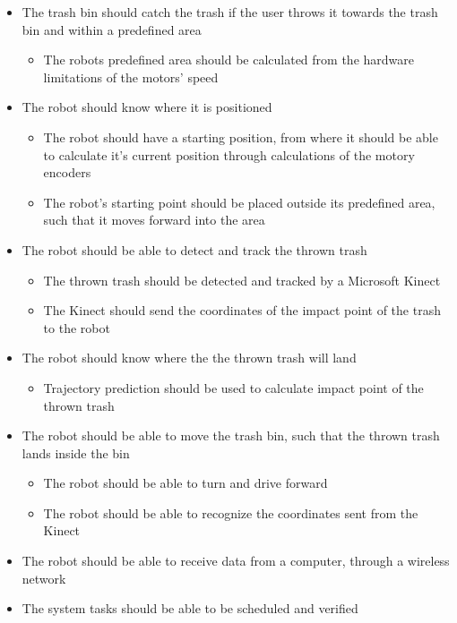 \begin{itemize}
	\item The trash bin should catch the trash if the user throws it towards the trash bin and within a predefined area
	\begin{itemize}
		\item {The robots predefined area should be calculated from the hardware limitations of the motors’ speed}
	\end{itemize}
	\item The robot should know where it is positioned
	\begin{itemize}
		\item{The robot should have a starting position, from where it should be able to calculate it's current position through calculations of the motory encoders}
		\item {The robot's starting point should be placed outside its predefined area, such that it moves forward into the area}
	\end{itemize}
	\item The robot should be able to detect and track the thrown trash
	\begin{itemize}
		\item {The thrown trash should be detected and tracked by a Microsoft Kinect}
		\item {The Kinect should send the coordinates of the impact point of the trash to the robot}
	\end{itemize}
	\item The robot should know where the the thrown trash will land
	\begin{itemize}
		\item {Trajectory prediction should be used to calculate impact point of the thrown trash}
	\end{itemize}
	\item The robot should be able to move the trash bin, such that the thrown trash lands inside the bin
	\begin{itemize}
		\item {The robot should be able to turn and drive forward}
		\item{The robot should be able to recognize the coordinates sent from the Kinect}
	\end{itemize}
	\item {The robot should be able to receive data from a computer, through a wireless network}
	\item {The system tasks should be able to be scheduled and verified}
\end{itemize}

